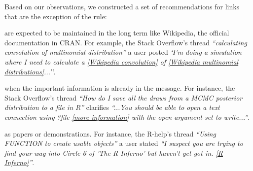 \documentclass{sig-alternate-05-2015}
\begin{document}
	Based on our observations, we constructed a set of recommendations for links that are the exception of the rule:

	\begin{description}
      \setlength{\itemsep}{3pt}
      \setlength{\parskip}{0pt}
      \setlength{\parsep}{0pt}
		\item[Well known websites] are expected to be maintained in the long term like Wikipedia, the official documentation in CRAN.
		For example, the Stack Overflow's thread \textit{``calculating convolution of multinomial distribution''} a user posted \textit{`I'm doing a simulation where I need to calculate a \href{https://en.wikipedia.org/wiki/Convolution_of_probability_distributions}{[Wikipedia convolution]} of \href{https://en.wikipedia.org/wiki/Multinomial_distribution}{[Wikipedia multinomial distributions]}...''}.

		\item[Resources that support or expand the message] when the important information is already in the message.
		For instance, the Stack Overflow's thread \textit{``How do I save all the draws from a MCMC posterior distribution to a file in R''} clarifies \textit{``...You should be able to open a text connection using ?file \href{http://stat.ethz.ch/R-manual/R-devel/library/base/html/connections.html}{[more information]} with the open argument set to write...''}.

		\item[Material relevant to the message is too big] as papers or demonstrations.
		For instance, the R-help's thread \textit{``Using FUNCTION to create usable objects''} a user stated \textit{``I suspect you are trying to find your way into Circle 6 of 'The R Inferno' but haven't yet got in. \href{http://www.burns-stat.com/pages/Tutor/R\_inferno.pdf}{[R Inferno]}''}.
	\end{description}



\end{document}
